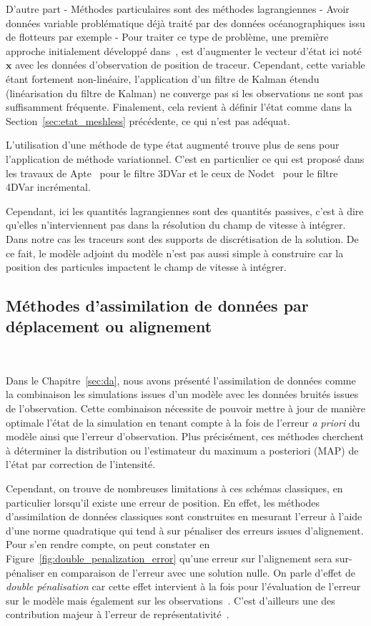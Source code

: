 D'autre part
- Méthodes particulaires sont des méthodes lagrangiennes
- Avoir données variable problématique déjà traité par des données océanographiques issu de flotteurs par exemple
- Pour traiter ce type de problème, une première approche initialement développé dans~\cite{ide_2002}, est d'augmenter le vecteur d'état ici noté $\bm x$ avec les données d'observation de position de traceur. Cependant, cette variable étant fortement non-linéaire, l'application d'un filtre de Kalman étendu (linéarisation du filtre de Kalman) ne converge pas si les observations ne sont pas suffisamment fréquente. Finalement, cela revient à définir l'état comme dans la Section~\ref{sec:etat_meshless} précédente, ce qui n'est pas adéquat.

L'utilisation d'une méthode de type état augmenté trouve plus de sens pour l'application de méthode variationnel.
C'est en particulier ce qui est proposé dans les travaux de Apte~\cite{apte_2008} pour le filtre 3DVar et le ceux de Nodet~\cite{nodet_2006} pour le filtre 4DVar incrémental.

Cependant, ici les quantités lagrangiennes sont des quantités passives, c'est à dire qu'elles n'interviennent pas dans la résolution du champ de vitesse à intégrer. Dans notre cas les traceurs sont des supports de discrétisation de la solution. De ce fait, le modèle adjoint du modèle n'est pas aussi simple à construire car la position des particules impactent le champ de vitesse à intégrer.


\subsection{Méthodes d'assimilation de données par déplacement ou alignement}~\label{sec:biblio_align}

Dans le Chapitre~\ref{sec:da}, nous avons présenté l'assimilation de données comme la combinaison les simulations issues d'un modèle avec les données bruités issues de l'observation. Cette combinaison nécessite de pouvoir mettre à jour de manière optimale l'état de la simulation en tenant compte à la fois de l'erreur \textit{a priori} du modèle ainsi que l'erreur d'observation. Plus précisément, ces méthodes cherchent à déterminer la distribution ou l'estimateur du maximum a posteriori (MAP) de l'état par correction de l'intensité.

Cependant, on trouve de nombreuses limitations à ces schémas classiques, en particulier lorsqu'il existe une erreur de position. En effet, les méthodes d'assimilation de données classiques sont construites en mesurant l'erreur à l'aide d'une norme quadratique qui tend à sur pénaliser des erreurs issues d'alignement. Pour s'en rendre compte, on peut constater en Figure~\ref{fig:double_penalization_error} qu'une erreur sur l'alignement sera sur-pénaliser en comparaison de l'erreur avec une solution nulle. On parle d'effet de \textit{double pénalisation} car cette effet intervient à la fois pour l'évaluation de l'erreur sur le modèle mais également sur les observations~\cite{amodei2009}. C'est d’ailleurs une des contribution majeur à l'erreur de représentativité~\cite{janjic2018}.

